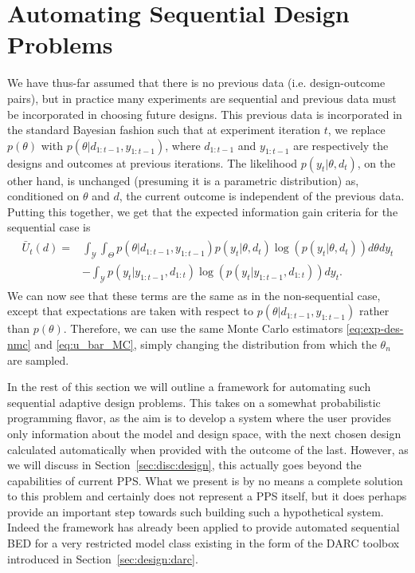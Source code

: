 
\section{Automating Sequential Design Problems}
\label{sec:design:seq}

We have thus-far assumed that there is no previous data (i.e. design-outcome pairs), but in practice many 
experiments are sequential and previous data must be incorporated in choosing future designs.
This previous data is incorporated in the standard Bayesian fashion such that
at experiment iteration $t$, we replace $p\left(\theta\right)$ with 
$p\left(\theta | d_{1:t-1}, y_{1:t-1}\right)$, where $d_{1:t-1}$ and  $y_{1:t-1}$ are 
respectively the designs and outcomes at previous iterations.
The likelihood $p\left(y_t | \theta, d_t\right)$, on the other hand, is unchanged (presuming it 
is a parametric distribution) as, conditioned on 
$\theta$ and $d$, the current outcome is independent of the previous data.
Putting this together, we get that the expected information gain criteria for the
sequential case is
\begin{align}
\label{eq:u_bar_seq}
\begin{split}
\bar{U}_t(d)
=&\int_{\mathcal{Y}}\int_{\Theta} p\left(\theta | d_{1:t-1}, y_{1:t-1}\right)
p(y_t | \theta, d_t) \log(p(y_t | \theta, d_t)) d\theta dy_t \\
&- \int_{\mathcal{Y}} p(y_t | y_{1:t-1}, d_{1:t}) \log(p(y_t | y_{1:t-1}, d_{1:t}))dy_t.
\end{split}
\end{align}
We can now see that these terms are the same as in the non-sequential case,
except that expectations are taken with respect to $p\left(\theta | d_{1:t-1}, y_{1:t-1}\right)$
rather than $p(\theta)$.  Therefore, we can use the same Monte Carlo estimators
\eqref{eq:exp-des-nmc} and \eqref{eq:u_bar_MC}, simply changing the distribution from which
the $\theta_n$ are sampled.

In the rest of this section we will outline a framework for automating such sequential
adaptive design problems.  This takes on a somewhat probabilistic programming flavor, as
the aim is to develop a system where the user provides only information about the model and
design space, with the next chosen design calculated automatically when provided with
the outcome of the last.  However, as we will discuss in Section~\ref{sec:disc:design}, this actually goes
beyond the capabilities of current PPS.  What we present is by no means a complete solution to
this problem and certainly does not represent a PPS itself, but it does perhaps provide an important
step towards such building such a hypothetical system.   Indeed the framework has already been
applied to provide automated sequential BED for a very restricted model class existing in the form of
the DARC toolbox~\citep{vincent2017darc} introduced in Section~\ref{sec:design:darc}.

